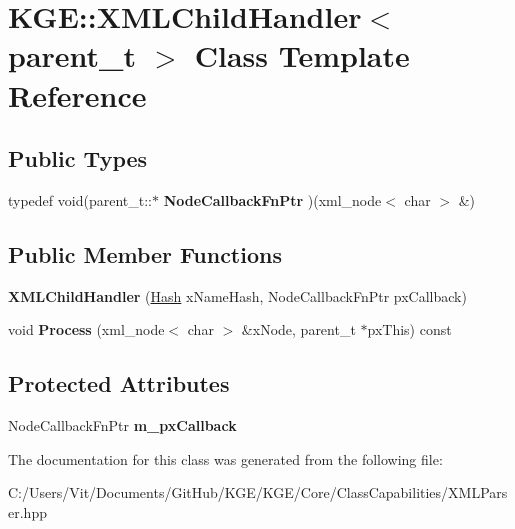 \hypertarget{class_k_g_e_1_1_x_m_l_child_handler}{\section{K\-G\-E\-:\-:X\-M\-L\-Child\-Handler$<$ parent\-\_\-t $>$ Class Template Reference}
\label{class_k_g_e_1_1_x_m_l_child_handler}
}
\subsection*{Public Types}
\begin{DoxyCompactItemize}
\item 
\hypertarget{class_k_g_e_1_1_x_m_l_child_handler_a0ca5aedec77909e6a11f6391e920bb85}{typedef void(parent\-\_\-t\-::$\ast$ {\bfseries Node\-Callback\-Fn\-Ptr} )(xml\-\_\-node$<$ char $>$ \&)}\label{class_k_g_e_1_1_x_m_l_child_handler_a0ca5aedec77909e6a11f6391e920bb85}

\end{DoxyCompactItemize}
\subsection*{Public Member Functions}
\begin{DoxyCompactItemize}
\item 
\hypertarget{class_k_g_e_1_1_x_m_l_child_handler_aa6334139a13ae6f5b9f48fc3e695849f}{{\bfseries X\-M\-L\-Child\-Handler} (\hyperlink{class_k_g_e_1_1_hash}{Hash} x\-Name\-Hash, Node\-Callback\-Fn\-Ptr px\-Callback)}\label{class_k_g_e_1_1_x_m_l_child_handler_aa6334139a13ae6f5b9f48fc3e695849f}

\item 
\hypertarget{class_k_g_e_1_1_x_m_l_child_handler_ad0b708157a391d15b9027c951ce36c92}{void {\bfseries Process} (xml\-\_\-node$<$ char $>$ \&x\-Node, parent\-\_\-t $\ast$px\-This) const }\label{class_k_g_e_1_1_x_m_l_child_handler_ad0b708157a391d15b9027c951ce36c92}

\end{DoxyCompactItemize}
\subsection*{Protected Attributes}
\begin{DoxyCompactItemize}
\item 
\hypertarget{class_k_g_e_1_1_x_m_l_child_handler_a8267c91e2b7b669c5aefb37383047472}{Node\-Callback\-Fn\-Ptr {\bfseries m\-\_\-px\-Callback}}\label{class_k_g_e_1_1_x_m_l_child_handler_a8267c91e2b7b669c5aefb37383047472}

\end{DoxyCompactItemize}


The documentation for this class was generated from the following file\-:\begin{DoxyCompactItemize}
\item 
C\-:/\-Users/\-Vit/\-Documents/\-Git\-Hub/\-K\-G\-E/\-K\-G\-E/\-Core/\-Class\-Capabilities/X\-M\-L\-Parser.\-hpp\end{DoxyCompactItemize}
